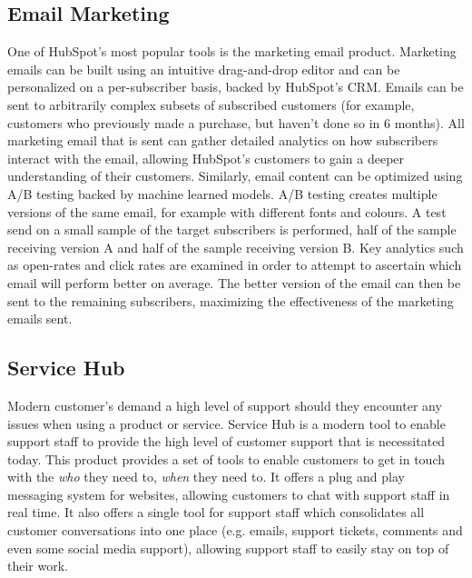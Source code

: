 \subsection{Email Marketing}
One of HubSpot's most popular tools is the marketing email product. Marketing emails can be built using an intuitive drag-and-drop editor and can be personalized on a per-subscriber basis, backed by HubSpot's CRM. Emails can be sent to arbitrarily complex subsets of subscribed customers (for example, customers who previously made a purchase, but haven't done so in 6 months). All marketing email that is sent can gather detailed analytics on how subscribers interact with the email, allowing HubSpot's customers to gain a deeper understanding of their customers. Similarly, email content can be optimized using A/B testing backed by machine learned models. A/B testing creates multiple versions of the same email, for example with different fonts and colours. A test send on a small sample of the target subscribers is performed, half of the sample receiving version A and half of the sample receiving version B. Key analytics such as open-rates and click rates are examined in order to attempt to ascertain which email will perform better on average. The better version of the email can then be sent to the remaining subscribers, maximizing the effectiveness of the marketing emails sent.

\subsection{Service Hub}
Modern customer's demand a high level of support should they encounter any issues when using a product or service. Service Hub is a modern tool to enable support staff to provide the high level of customer support that is necessitated today. This product provides a set of tools to enable customers to get in touch with the \textit{who} they need to, \textit{when} they need to. It offers a plug and play messaging system for websites, allowing customers to chat with support staff in real time. It also offers a single tool for support staff which consolidates all customer conversations into one place (e.g. emails, support tickets, comments and even some social media support), allowing support staff to easily stay on top of their work. 



